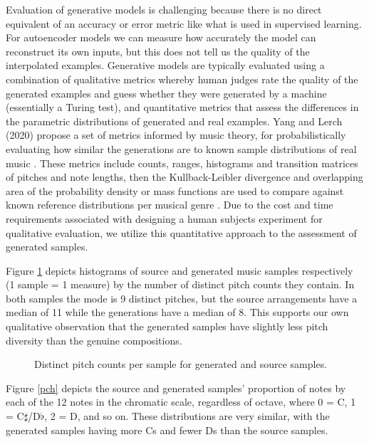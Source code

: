 \documentclass[sigconf,authorversion]{acmart}
\begin{document}
Evaluation of generative models is challenging because there is no
direct equivalent of an accuracy or error metric like what is used in
supervised learning. For autoencoder models we can measure how
accurately the model can reconstruct its own inputs, but this does not
tell us the quality of the interpolated examples. Generative models
are typically evaluated using a combination of qualitative metrics
whereby human judges rate the quality of the generated examples and
guess whether they were generated by a machine (essentially a Turing
test), and quantitative metrics that assess the differences in the
parametric distributions of generated and real examples. Yang and
Lerch (2020) propose a set of metrics informed by music theory, for
probabilistically evaluating how similar the generations are to known
sample distributions of real music \cite{yang_evaluation_2020}. These
metrics include counts, ranges, histograms and transition matrices of
pitches and note lengths, then the Kullback-Leibler divergence and
overlapping area of the probability density or mass functions are
used to compare against known reference distributions per musical
genre \cite{yang_evaluation_2020}. Due to the cost and time
requirements associated with designing a human subjects experiment for
qualitative evaluation, we utilize this quantitative approach to the
assessment of generated samples.

Figure \ref{pitch_counts} depicts histograms of source and generated
music samples respectively (1 sample = 1 measure) by the number of
distinct pitch counts they contain. In both samples the mode is 9
distinct pitches, but the source arrangements have a median of 11
while the generations have a median of 8. This supports our own
qualitative observation that the generated samples have slightly less
pitch diversity than the genuine compositions.

\begin{figure}[htbp]
    \begin{center}
        \scalebox{0.6}{}
    \end{center}
    \caption{Distinct pitch counts per sample for generated and source samples.}
    \label{pitch_counts}
\end{figure}

Figure \ref{pch} depicts the source and generated samples' proportion
of notes by each of the 12 notes in the chromatic scale, regardless of
octave, where 0 = C, 1 = C$\sharp$/D$\flat$, 2 = D, and so on. These
distributions are very similar, with the generated samples having more
Cs and fewer Ds than the source samples.
\end{document}
